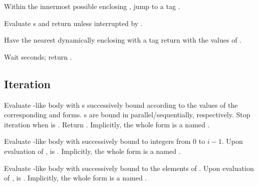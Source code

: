 \begin{LIST}{1cm}
  {
    Within the innermost possible enclosing , jump to a
    tag  .
  }

  {
    Evaluate s and return  unless
    interrupted by .
  }

  {
    Have the nearest dynamically
    enclosing  with a tag   return with the
    values of .
  }

  {
    Wait  seconds; return \retval{\NIL}.
  }

\end{LIST}


\subsection{Iteration}

\begin{LIST}{1cm}

  {
    Evaluate -like body with s successively bound
    according to the values of the corresponding  and
     forms. s are bound in parallel/sequentially,
    respectively. Stop iteration when  is \T. Return
    . Implicitly, the whole form
    is a  named \NIL.
  }

  {
    Evaluate -like body with  successively bound
    to integers from 0 to $i - 1$. Upon evaluation of
    ,  is . Implicitly, the whole
    form is a  named \NIL.
  }

  {
    Evaluate -like body with  successively bound
    to the elements of . Upon evaluation of
    ,  is \NIL. Implicitly, the whole form
    is a  named \NIL.
  }


\end{LIST}

